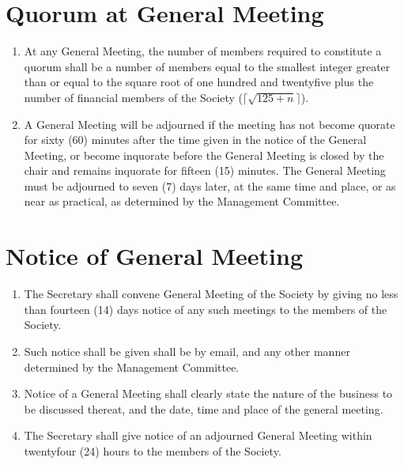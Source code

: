 \documentclass[a4paper]{article}
\newcommand*{\sectionr}[1]{{\raggedright \section{#1}}}
\begin{document}
\sectionr{Quorum at General Meeting}
\begin{enumerate}
\item At any General Meeting, the number of members required to constitute a quorum shall be a number of members equal to the smallest integer greater than or equal to the square root of one hundred and twenty\textendash five plus the number of financial members of the Society ($\Big\lceil\sqrt{125+n}\Big\rceil$).
\item A General Meeting will be adjourned if the meeting has not become quorate for sixty (60) minutes after the time given in the notice of the General Meeting, or become inquorate before the General Meeting is closed by the chair and remains inquorate for fifteen (15) minutes. The General Meeting must be adjourned to seven (7) days later, at the same time and place, or as near as practical, as determined by the Management Committee.
\end{enumerate}

\sectionr{Notice of General Meeting}
\begin{enumerate}
\item The Secretary shall convene General Meeting of the Society by giving no less than fourteen (14) days notice of any such meetings to the members of the Society.
\item Such notice shall be given shall be by e\textendash mail, and any other manner determined by the Management Committee.
\item Notice of a General Meeting shall clearly state the nature of the business to be discussed thereat, and the date, time and place of the general meeting.
\item The Secretary shall give notice of an adjourned General Meeting within twenty\textendash four (24) hours to the members of the Society.
\end{enumerate}
\end{document}
